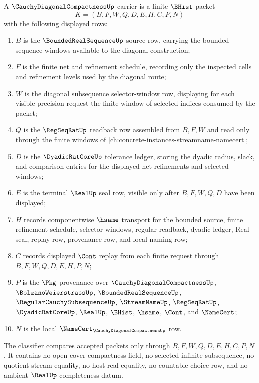\begin{definition}
\label{def:cauchy-diagonal-compactness-carrier}
A $\CauchyDiagonalCompactnessUp$ carrier is a finite $\BHist$ packet
$$
K=(B,F,W,Q,D,E,H,C,P,N)
$$
with the following displayed rows:
\begin{enumerate}
\item $B$ is the $\BoundedRealSequenceUp$ source row, carrying the bounded sequence windows available to the diagonal construction;
\item $F$ is the finite net and refinement schedule, recording only the inspected cells and refinement levels used by the diagonal route;
\item $W$ is the diagonal subsequence selector-window row, displaying for each visible precision request the finite window of selected indices consumed by the packet;
\item $Q$ is the $\RegSeqRatUp$ readback row assembled from $B,F,W$ and read only through the finite windows of \autoref{ch:concrete-instances-streamname-namecert};
\item $D$ is the $\DyadicRatCoreUp$ tolerance ledger, storing the dyadic radius, slack, and comparison entries for the displayed net refinements and selected windows;
\item $E$ is the terminal $\RealUp$ seal row, visible only after $B,F,W,Q,D$ have been displayed;
\item $H$ records componentwise $\hsame$ transport for the bounded source, finite refinement schedule, selector windows, regular readback, dyadic ledger, Real seal, replay row, provenance row, and local naming row;
\item $C$ records displayed $\Cont$ replay from each finite request through $B,F,W,Q,D,E,H,P,N$;
\item $P$ is the $\Pkg$ provenance over $\CauchyDiagonalCompactnessUp$, $\BolzanoWeierstrassUp$, $\BoundedRealSequenceUp$, $\RegularCauchySubsequenceUp$, $\StreamNameUp$, $\RegSeqRatUp$, $\DyadicRatCoreUp$, $\RealUp$, $\BHist$, $\hsame$, $\Cont$, and $\NameCert$;
\item $N$ is the local $\NameCert_{\CauchyDiagonalCompactnessUp}$ row.
\end{enumerate}
The classifier compares accepted packets only through $B,F,W,Q,D,E,H,C,P,N$. It contains no open-cover compactness field, no selected infinite subsequence, no quotient stream equality, no host real equality, no countable-choice row, and no ambient $\RealUp$ completeness datum.
\end{definition}


